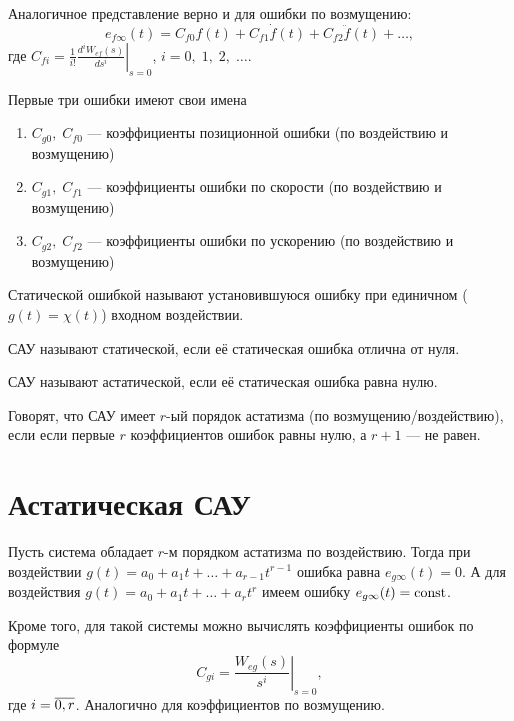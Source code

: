\documentclass[../../TAU.tex]{subfiles}
\begin{document}
    Аналогичное представление верно и для ошибки по возмущению:
    $$
        e_{f\infty}(t) = C_{f0} f(t) + C_{f1} \dot f(t) + C_{f2} \ddot f(t) + \ldots,
    $$
    где $C_{fi} =\frac{1}{i!}\left.\frac{d^iW_{ef}(s)}{ds^i}\right|_{s=0}$, $i=0,\;1,\;2,\;\ldots$.

    Первые три ошибки имеют свои имена
    \begin{enumerate}
        \item $C_{g0},\; C_{f0}$ --- коэффициенты позиционной ошибки (по воздействию и возмущению)
        \item $C_{g1},\; C_{f1}$ --- коэффициенты ошибки по скорости (по воздействию и возмущению)
        \item $C_{g2},\; C_{f2}$ --- коэффициенты ошибки по ускорению (по воздействию и возмущению)
    \end{enumerate}

    \begin{defi}
    Статической ошибкой называют установившуюся ошибку при единичном ($g(t) = \chi(t)$) входном воздействии.
    \end{defi}

    \begin{defi}
    САУ называют статической, если её статическая ошибка отлична от нуля.
    \end{defi}

    \begin{defi}
    САУ называют астатической, если её статическая ошибка равна нулю.
    \end{defi}

    \begin{defi}
    Говорят, что САУ имеет $r$-ый порядок астатизма (по возмущению/воздействию), если если первые $r$ коэффициентов ошибок равны нулю, а $r+1$ --- не равен.
    \end{defi}

\section{Астатическая САУ}

    Пусть система обладает $r$-м порядком астатизма по воздействию. Тогда при воздействии $g(t) = a_0+a_1t+\ldots+ a_{r-1}t^{r-1}$ ошибка равна $e_{g\infty}(t) = 0$. А для воздействия $g(t) = a_0+a_1t+\ldots+ a_{r}t^{r}$ имеем ошибку $e_{g\infty}(t) = \mathop{\mathrm{const}}\nolimits$.

    Кроме того, для такой системы можно вычислять коэффициенты ошибок по формуле
    $$
        C_{gi} = \left.\frac{W_{eg}(s)}{s^i}\right|_{s=0},
    $$
    где $i = \overline{0,r}$. Аналогично для коэффициентов по возмущению.
\end{document}

